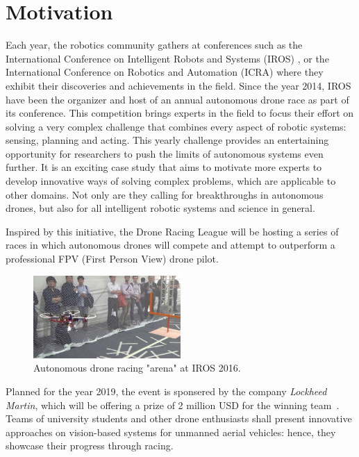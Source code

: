 \section{Motivation}


Each year, the robotics community gathers at conferences such as the
International Conference on Intelligent Robots and Systems (IROS) , or the
International Conference on Robotics and Automation (ICRA) where they exhibit
their discoveries and achievements in the field. Since the year 2014, IROS have
been the organizer and host of an annual autonomous drone race as part of its
conference. This competition brings experts in the field to focus their effort
on solving a very complex challenge that combines every aspect of robotic
systems: sensing, planning and acting. This yearly challenge provides an
entertaining opportunity for researchers to push the limits of autonomous
systems even further. It is an exciting case study that aims to motivate more
experts to develop innovative ways of solving complex problems, which are
applicable to other domains. Not only are they calling for breakthroughs in
autonomous drones, but also for all intelligent robotic systems and science in
general.

Inspired by this initiative, the Drone Racing League will be hosting a series
of races in which autonomous drones will compete and attempt to outperform a
professional FPV (First Person View) drone pilot.\\

\begin{figure}[h]
	\centering
	\includegraphics[width=0.5\textwidth]{figure/iros_2016.jpg}
	\caption{Autonomous drone racing "arena" at IROS 2016.}
	\label{fig:iros}
\end{figure}

Planned for the year 2019, the event is sponsered by the company \emph{Lockheed
Martin}, which will be offering a prize of 2 million USD for the winning
team~\cite{LockheedDRL}. Teams of university students and other drone
enthusiasts shall present innovative approaches on vision-based systems for
unmanned aerial vehicles: hence, they showcase their progress through racing.

